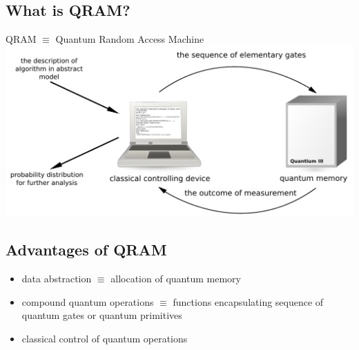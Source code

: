 \documentclass{beamer}
\begin{document}
\subsection{What is QRAM?}
\begin{frame}{\insertsection}{\insertsubsection}
	\begin{center}
	QRAM $\equiv$ Quantum Random Access Machine\\[12pt]
    \includegraphics[width=\textwidth]{pics/qram}
\end{center}
\end{frame}


\subsection{Advantages of QRAM}
\begin{frame}{\insertsection}{\insertsubsection}
	
\begin{itemize}
	\item data abstraction $\equiv$ allocation of quantum memory
	\item compound quantum operations $\equiv$ functions encapsulating sequence of quantum gates or quantum primitives
	\item classical control of quantum operations 
\end{itemize}

\end{frame}

\end{document}
